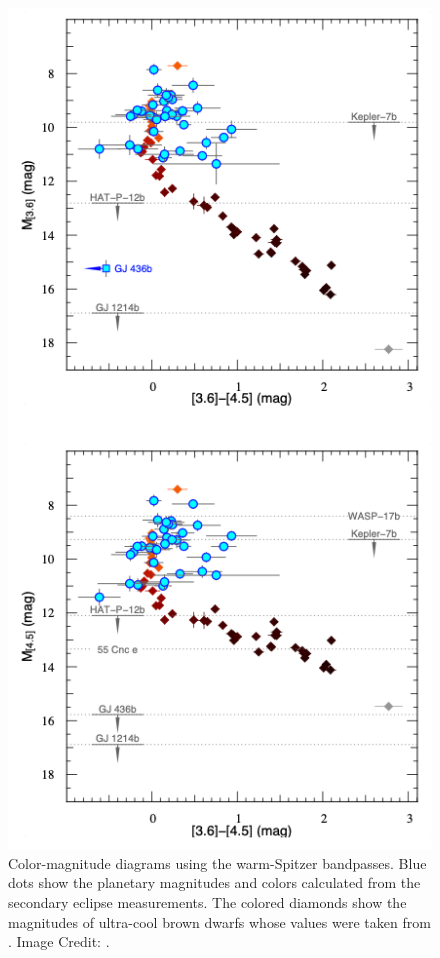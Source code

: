 \begin{figure}
    \centering
    \includegraphics[height = \textheight]{triaud.png}
    \caption{Color-magnitude diagrams using the warm-Spitzer bandpasses. Blue dots show the planetary magnitudes and colors calculated from the secondary eclipse measurements. The colored diamonds show the magnitudes of ultra-cool brown dwarfs whose values were taken from \citet{Dupuy2012}. Image Credit: \citet{Triaud2014c}.}
    \label{int:fig:triaud}
\end{figure}

